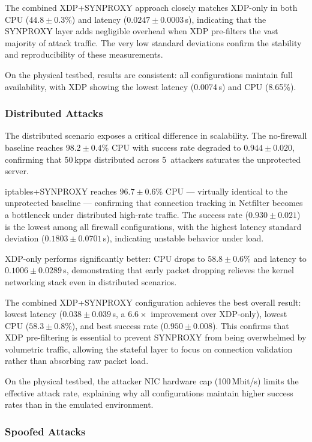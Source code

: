\documentclass[conference]{IEEEtran}
\begin{document}
The combined XDP+SYNPROXY approach closely matches XDP-only in both
CPU ($44.8 \pm 0.3$\%) and latency ($0.0247 \pm 0.0003$\,s), indicating
that the SYNPROXY layer adds negligible overhead when XDP pre-filters the
vast majority of attack traffic.
The very low standard deviations confirm the stability and reproducibility
of these measurements.

On the physical testbed, results are consistent: all configurations
maintain full availability, with XDP showing the lowest latency (0.0074\,s)
and CPU (8.65\%).

\subsubsection{Distributed Attacks}

The distributed scenario exposes a critical difference in scalability.
The no-firewall baseline reaches $98.2 \pm 0.4$\% CPU with success rate
degraded to $0.944 \pm 0.020$, confirming that 50\,kpps distributed across
5~attackers saturates the unprotected server.

iptables+SYNPROXY reaches $96.7 \pm 0.6$\% CPU --- virtually identical to
the unprotected baseline --- confirming that connection tracking in Netfilter
becomes a bottleneck under distributed high-rate traffic.
The success rate ($0.930 \pm 0.021$) is the lowest among all firewall
configurations, with the highest latency standard deviation
($0.1803 \pm 0.0701$\,s), indicating unstable behavior under load.

XDP-only performs significantly better: CPU drops to $58.8 \pm 0.6$\%
and latency to $0.1006 \pm 0.0289$\,s, demonstrating that early packet
dropping relieves the kernel networking stack even in distributed scenarios.

The combined XDP+SYNPROXY configuration achieves the best overall result:
lowest latency ($0.038 \pm 0.039$\,s, a $6.6\times$ improvement over
XDP-only), lowest CPU ($58.3 \pm 0.8$\%), and best success rate
($0.950 \pm 0.008$).
This confirms that XDP pre-filtering is essential to prevent SYNPROXY from
being overwhelmed by volumetric traffic, allowing the stateful layer to
focus on connection validation rather than absorbing raw packet load.

On the physical testbed, the attacker NIC hardware cap (100\,Mbit/s)
limits the effective attack rate, explaining why all configurations maintain
higher success rates than in the emulated environment.

\subsubsection{Spoofed Attacks}
\end{document}

